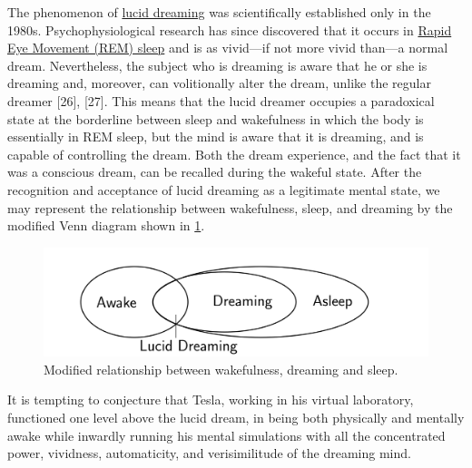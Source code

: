 \documentclass[
  12pt,
  british,
  a4paper,
]{article}
\begin{document}
The phenomenon of \href{https://en.wikipedia.org/wiki/Lucid_dream}{lucid
dreaming} was scientifically established only in the 1980s.
Psychophysiological research has since discovered that it occurs in
\href{https://en.wikipedia.org/wiki/Rapid_eye_movement_sleep}{Rapid Eye
Movement (REM) sleep} and is as vivid---if not more vivid than---a
normal dream. Nevertheless, the subject who is dreaming is aware that he
or she is dreaming and, moreover, can volitionally alter the dream,
unlike the regular dreamer {[}26{]}, {[}27{]}. This means that the lucid
dreamer occupies a paradoxical state at the borderline between sleep and
wakefulness in which the body is essentially in REM sleep, but the mind
is aware that it is dreaming, and is capable of controlling the dream.
Both the dream experience, and the fact that it was a conscious dream,
can be recalled during the wakeful state. After the recognition and
acceptance of lucid dreaming as a legitimate mental state, we may
represent the relationship between wakefulness, sleep, and dreaming by
the modified Venn diagram shown in \cref{fig:lucid}.

\begin{figure}
\hypertarget{fig:lucid}{%
\centering
\includegraphics[width=1\textwidth,height=\textheight]{images/lucid.svg}
\caption[Modified relationship between wakefulness, dreaming and
sleep.]{Modified relationship between wakefulness, dreaming and
sleep.\footnotemark{}}\label{fig:lucid}
}
\end{figure}

It is tempting to conjecture that Tesla, working in his virtual
laboratory, functioned one level above the lucid dream, in being both
physically and mentally awake while inwardly running his mental
simulations with all the concentrated power, vividness, automaticity,
and verisimilitude of the dreaming mind.
\end{document}
